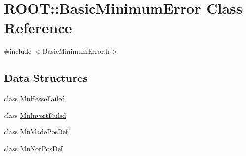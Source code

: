 \hypertarget{classROOT_1_1Minuit2_1_1BasicMinimumError}{}\section{R\+O\+OT\+:\+:Basic\+Minimum\+Error Class Reference}
\label{classROOT_1_1Minuit2_1_1BasicMinimumError}


{\ttfamily \#include $<$Basic\+Minimum\+Error.\+h$>$}

\subsection*{Data Structures}
\begin{DoxyCompactItemize}
\item 
class \mbox{\hyperlink{classROOT_1_1Minuit2_1_1BasicMinimumError_1_1MnHesseFailed}{Mn\+Hesse\+Failed}}
\item 
class \mbox{\hyperlink{classROOT_1_1Minuit2_1_1BasicMinimumError_1_1MnInvertFailed}{Mn\+Invert\+Failed}}
\item 
class \mbox{\hyperlink{classROOT_1_1Minuit2_1_1BasicMinimumError_1_1MnMadePosDef}{Mn\+Made\+Pos\+Def}}
\item 
class \mbox{\hyperlink{classROOT_1_1Minuit2_1_1BasicMinimumError_1_1MnNotPosDef}{Mn\+Not\+Pos\+Def}}
\end{DoxyCompactItemize}

